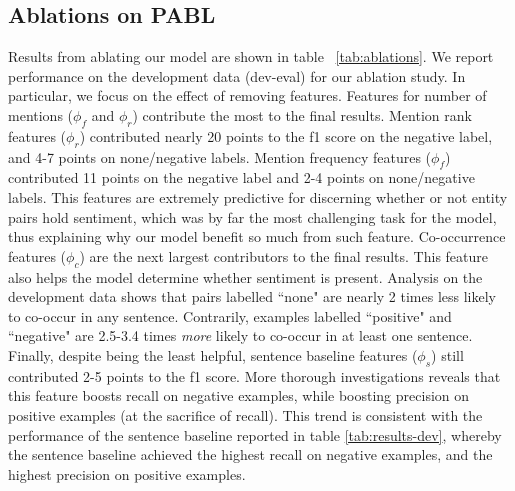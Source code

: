 \documentclass[11pt,a4paper]{article}
\begin{document}
\subsection{Ablations on PABL}
Results from ablating our model are shown in table ~\ref{tab:ablations}.
We report performance on the development data (dev-eval) for our ablation study.
In particular, we focus on the effect of removing features.
Features for number of mentions ($\phi_f$ and $\phi_r$) contribute the most to the final results.
Mention rank features ($\phi_r$) contributed nearly 20 points to the f1 score on the negative label, and 4-7 points on none/negative labels.
Mention frequency features ($\phi_f$) contributed 11 points on the negative label and 2-4 points on none/negative labels.
This features are extremely predictive for discerning whether or not entity pairs hold sentiment, which was by far the most challenging task for the model, thus explaining why our model benefit so much from such feature.
Co-occurrence features ($\phi_c$) are the next largest contributors to the final results.
This feature also helps the model determine whether sentiment is present.
Analysis on the development data shows that pairs labelled ``none"  are nearly 2 times less likely to co-occur in any sentence. Contrarily, examples labelled ``positive" and ``negative" are 2.5-3.4 times \textit{more} likely to co-occur in at least one sentence.
Finally, despite being the least helpful, sentence baseline features ($\phi_s$) still contributed 2-5 points to the f1 score.
More thorough investigations reveals that this feature boosts recall on negative examples, while boosting precision on positive examples (at the sacrifice of recall).
This trend is consistent with the performance of the sentence baseline reported in table \ref{tab:results-dev}, whereby the sentence baseline achieved the highest recall on negative examples, and the highest precision on positive examples.
\end{document}
